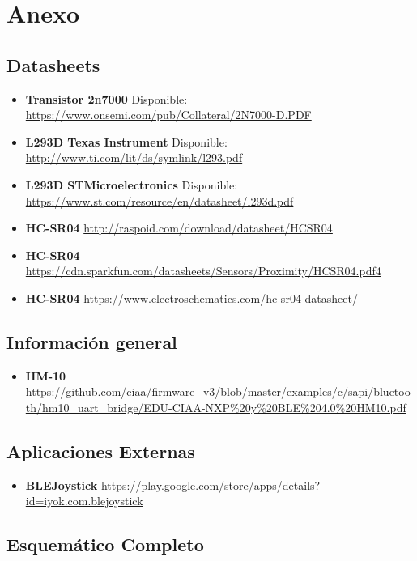 \chapter{Anexo}

\section{Datasheets}

\begin{itemize}
	\item
	\textbf{Transistor 2n7000} Disponible:
	\url{https://www.onsemi.com/pub/Collateral/2N7000-D.PDF}
	\item
	\textbf{L293D Texas Instrument} Disponible:
	\url{http://www.ti.com/lit/ds/symlink/l293.pdf}
	\item
	\textbf{L293D STMicroelectronics} Disponible:
	\url{https://www.st.com/resource/en/datasheet/l293d.pdf}
	\item 
	\textbf{HC-SR04} \url{http://raspoid.com/download/datasheet/HCSR04}
	\item 
	\textbf{HC-SR04} \url{https://cdn.sparkfun.com/datasheets/Sensors/Proximity/HCSR04.pdf4}
	\item 
	\textbf{HC-SR04} \url{https://www.electroschematics.com/hc-sr04-datasheet/}
\end{itemize}

\section{Información general}

\begin{itemize}
	\item
	\textbf{HM-10} \url{https://github.com/ciaa/firmware\_v3/blob/master/examples/c/sapi/bluetooth/hm10\_uart\_bridge/EDU-CIAA-NXP\%20y\%20BLE\%204.0\%20HM10.pdf}
\end{itemize}

\section{Aplicaciones Externas}

\begin{itemize}
	\item
	\textbf{BLEJoystick} \url{https://play.google.com/store/apps/details?id=iyok.com.blejoystick}
\end{itemize}



\section{Esquemático Completo}
